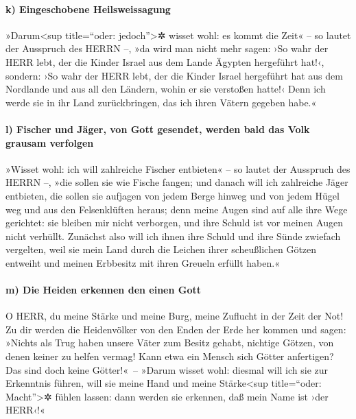 \hypertarget{k-eingeschobene-heilsweissagung}{%
\paragraph{k) Eingeschobene
Heilsweissagung}\label{k-eingeschobene-heilsweissagung}}

»Darum\textless sup title=``oder: jedoch''\textgreater✲
wisset wohl: es kommt die Zeit« -- so lautet der Ausspruch des HERRN --,
»da wird man nicht mehr sagen: ›So wahr der HERR lebt, der die Kinder
Israel aus dem Lande Ägypten hergeführt hat!‹, sondern:
›So wahr der HERR lebt, der die Kinder Israel hergeführt hat aus dem
Nordlande und aus all den Ländern, wohin er sie verstoßen hatte!‹ Denn
ich werde sie in ihr Land zurückbringen, das ich ihren Vätern gegeben
habe.«

\hypertarget{l-fischer-und-juxe4ger-von-gott-gesendet-werden-bald-das-volk-grausam-verfolgen}{%
\paragraph{l) Fischer und Jäger, von Gott gesendet, werden bald das Volk
grausam
verfolgen}\label{l-fischer-und-juxe4ger-von-gott-gesendet-werden-bald-das-volk-grausam-verfolgen}}

»Wisset wohl: ich will zahlreiche Fischer entbieten« --
so lautet der Ausspruch des HERRN --, »die sollen sie wie Fische fangen;
und danach will ich zahlreiche Jäger entbieten, die sollen sie aufjagen
von jedem Berge hinweg und von jedem Hügel weg und aus den Felsenklüften
heraus; denn meine Augen sind auf alle ihre Wege
gerichtet: sie bleiben mir nicht verborgen, und ihre Schuld ist vor
meinen Augen nicht verhüllt. Zunächst also will ich ihnen
ihre Schuld und ihre Sünde zwiefach vergelten, weil sie mein Land durch
die Leichen ihrer scheußlichen Götzen entweiht und meinen Erbbesitz mit
ihren Greueln erfüllt haben.«

\hypertarget{m-die-heiden-erkennen-den-einen-gott}{%
\paragraph{m) Die Heiden erkennen den einen
Gott}\label{m-die-heiden-erkennen-den-einen-gott}}

O HERR, du meine Stärke und meine Burg, meine Zuflucht in
der Zeit der Not! Zu dir werden die Heidenvölker von den Enden der Erde
her kommen und sagen: »Nichts als Trug haben unsere Väter zum Besitz
gehabt, nichtige Götzen, von denen keiner zu helfen vermag!
Kann etwa ein Mensch sich Götter anfertigen? Das sind
doch keine Götter!«~-- »Darum wisset wohl: diesmal will
ich sie zur Erkenntnis führen, will sie meine Hand und meine
Stärke\textless sup title=``oder: Macht''\textgreater✲ fühlen lassen:
dann werden sie erkennen, daß mein Name ist ›der HERR‹!«


